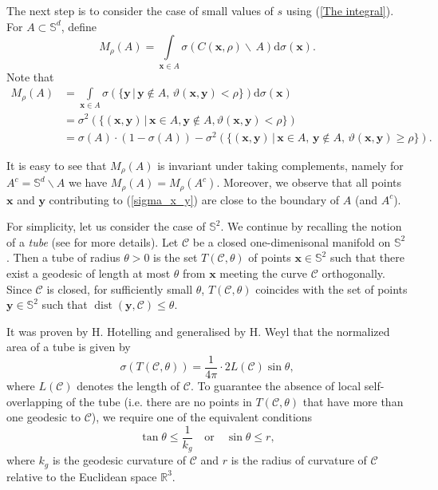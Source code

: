 \documentclass[a4paper,11pt]{amsart}
\begin{document}
The next step is to consider the case of small values of $s$ using (\ref{The integral}). For $A\subset\mathbb{S}^d$, define
\begin{equation}\label{definition_of_M}
    M_\rho(A)=\int\limits_{\mathbf{x}\in A}\sigma\left( C\left(\mathbf{x},\rho\right)\backslash\, A\right)\mathrm{d}\sigma(\mathbf{x}).
\end{equation}
Note that
 \begin{align}
M_\rho(A)&=\int\limits_{\mathbf{x}\in A}\sigma\left(\{ \mathbf{y}\,|\, \mathbf{y}\not\in A, \, \vartheta(\mathbf{x},\mathbf{y})<\rho\}\right)\mathrm{d}\sigma(\mathbf{x}) \nonumber
\\ &=\sigma^2\left( \{(\mathbf{x},\mathbf{y})\,|\, \mathbf{x}\in A, \mathbf{y}\not\in A, \vartheta(\mathbf{x},\mathbf{y})<\rho\}\right) \label{sigma_x_y}
\\ &=\sigma(A)\cdot \left(1-\sigma(A)\right)-\sigma^2\left( \{(\mathbf{x},\mathbf{y})\,|\, \mathbf{x}\in A,\, \mathbf{y}\not\in A,\, \vartheta(\mathbf{x},\mathbf{y})\geq\rho\}\right). \nonumber
 \end{align}

It is easy to see that $M_\rho(A)$ is invariant under taking complements, namely for $A^c=\mathbb{S}^d\backslash A$ we have $M_\rho(A)=M_\rho(A^c)$. Moreover, we observe that all points $\mathbf{x}$ and $\mathbf{y}$ contributing to (\ref{sigma_x_y}) are close to the boundary of $A$ (and $A^c$). 

For simplicity, let us consider the case of $\mathbb{S}^2$. We continue by recalling the notion of a \textit{tube} (see \cite{Gray2004} for more details). Let $\mathcal{C}$ be a closed one-dimenisonal manifold on $\mathbb{S}^2$. Then a tube of radius $\theta>0$ is the set $   T(\mathcal{C},\theta)$ of points $\mathbf{x}\in\mathbb{S}^2$ such that there exist a geodesic of length at most $\theta$ from $\mathbf{x}$ meeting the curve $\mathcal C$ orthogonally. Since $\mathcal{C}$ is closed, for sufficiently small $\theta$, $T(\mathcal{C},\theta)$ coincides with the set of points  $\mathbf{y}\in\mathbb{S}^2$ such that $\operatorname{dist}(\mathbf{y},\mathcal{C})\leq \theta$. 

It was proven by H. Hotelling \cite{Hotelling1939} and generalised by H. Weyl \cite{Weyl1939} that the normalized area of a tube is given by 
\begin{equation*}
    \sigma(T(\mathcal{C},\theta))=\frac{1}{4\pi}\cdot 2 L(\mathcal{C})\sin\theta,
\end{equation*}
where $L(\mathcal{C})$ denotes the length of $\mathcal{C}$. To guarantee the absence of local self-overlapping of the tube (i.e. there are no points in $T(\mathcal{C},\theta)$ that have more than one geodesic to $\mathcal{C}$), we require one of the equivalent conditions
\begin{equation}\label{no overlap condition}
\tan \theta\leq \frac{1}{k_g} \quad\text{or}\quad \sin \theta \leq r,    
\end{equation} where $k_g$ is the geodesic curvature of $\mathcal{C}$ and $r$ is the radius of curvature of $\mathcal{C}$ relative to the Euclidean space $\mathbb{R}^3$.
\end{document}
